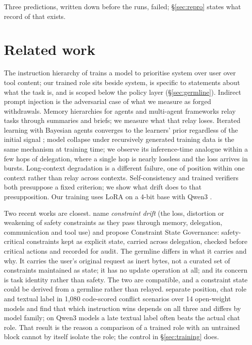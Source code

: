 \documentclass[11pt]{article}
\newcommand{\sys}{\textsf{system}}
\begin{document}
Three predictions, written down before the runs, failed; \S\ref{sec:repro} states what record of that exists.

\section{Related work}

The instruction hierarchy of \citet{wallace2024} trains a model to prioritise system over user over tool content; our trained role sits beside \sys{}, is specific to statements about what the task is, and is scoped below the policy layer (\S\ref{sec:germline}). Indirect prompt injection \citep{greshake2023} is the adversarial case of what we measure as forged withdrawals. Memory hierarchies for agents \citep{packer2023memgpt} and multi-agent frameworks \citep{wu2023autogen,hong2024metagpt} relay tasks through summaries and briefs; we measure what that relay loses. Iterated learning with Bayesian agents converges to the learners' prior regardless of the initial signal \citep{griffiths2007,kirby2007}; model collapse under recursively generated training data \citep{shumailov2024} is the same mechanism at training time; we observe its inference-time analogue within a few hops of delegation, where a single hop is nearly lossless and the loss arrives in bursts. Long-context degradation \citep{liu2024lost} is a different failure, one of position within one context rather than relay across contexts. Self-consistency \citep{wang2023selfconsistency} and trained verifiers \citep{cobbe2021} both presuppose a fixed criterion; we show what drift does to that presupposition. Our training uses LoRA \citep{hu2022lora} on a 4-bit base \citep{dettmers2023qlora} with Qwen3 \citep{qwen3}.

Two recent works are closest. \citet{li2026constraintdrift} name \emph{constraint drift} (the loss, distortion or weakening of safety constraints as they pass through memory, delegation, communication and tool use) and propose Constraint State Governance: safety-critical constraints kept as explicit state, carried across delegation, checked before critical actions and recorded for audit. The germline differs in what it carries and why. It carries the user's original request as inert bytes, not a curated set of constraints maintained as state; it has no update operation at all; and its concern is task identity rather than safety. The two are compatible, and a constraint state could be derived from a germline rather than relayed. \citet{laddha2026position} separate position, chat role and textual label in 1,080 code-scored conflict scenarios over 14 open-weight models and find that which instruction wins depends on all three and differs by model family; on Qwen3 models a late textual label often beats the actual chat role. That result is the reason a comparison of a trained role with an untrained block cannot by itself isolate the role; the control in \S\ref{sec:training} does.
\end{document}
